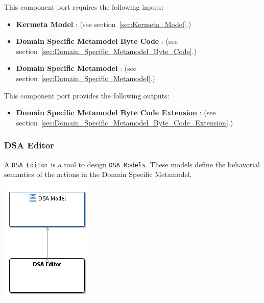\documentclass{gemoc} %
\begin{document}
This component port requires the following inputs:
\begin{itemize}
  \item \textbf{Kermeta Model} :
(see section~\ref{sec:Kermeta_Model}.)
  \item \textbf{Domain Specific Metamodel Byte Code} :
(see section~\ref{sec:Domain_Specific_Metamodel_Byte_Code}.)
  \item \textbf{Domain Specific Metamodel} :
(see section~\ref{sec:Domain_Specific_Metamodel}.)
\end{itemize}

This component port provides the following outputs:
\begin{itemize}
  \item \textbf{Domain Specific Metamodel Byte Code Extension} :
(see section~\ref{sec:Domain_Specific_Metamodel_Byte_Code_Extension}.)
\end{itemize}



\subsubsection{DSA Editor}
\label{sec:DSA_Editor}

A \texttt{DSA Editor} is a tool to design \texttt{DSA Models}.
These models define the behavorial semantics of the actions in the Domain Specific Metamodel.
\begin{center}
\includegraphics*[trim=0.0cm 0.0cm 0cm 0.0cm, clip=true]{../images/generated/Generated_DSA_Editor.png}
\end{center}
\end{document}
